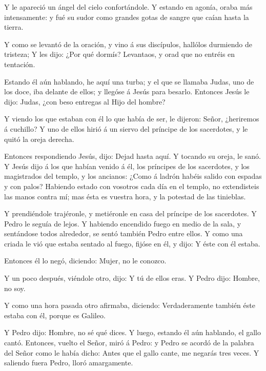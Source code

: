  Y le apareció un ángel del cielo confortándole.
 Y estando en agonía, oraba más intensamente: y fué su
sudor como grandes gotas de sangre que caían hasta la tierra.

 Y como se levantó de la oración, y vino á sus discípulos,
hallólos durmiendo de tristeza;  Y les dijo: ¿Por qué
dormís? Levantaos, y orad que no entréis en tentación.

 Estando él aún hablando, he aquí una turba; y el que se
llamaba Judas, uno de los doce, iba delante de ellos; y llegóse á Jesús
para besarlo.  Entonces Jesús le dijo: Judas, ¿con beso
entregas al Hijo del hombre?

 Y viendo los que estaban con él lo que había de ser, le
dijeron: Señor, ¿heriremos á cuchillo?  Y uno de ellos
hirió á un siervo del príncipe de los sacerdotes, y le quitó la oreja
derecha.

 Entonces respondiendo Jesús, dijo: Dejad hasta aquí. Y
tocando su oreja, le sanó.  Y Jesús dijo á los que habían
venido á él, los príncipes de los sacerdotes, y los magistrados del
templo, y los ancianos: ¿Como á ladrón habéis salido con espadas y con
palos?  Habiendo estado con vosotros cada día en el templo,
no extendisteis las manos contra mí; mas ésta es vuestra hora, y la
potestad de las tinieblas.

 Y prendiéndole trajéronle, y metiéronle en casa del
príncipe de los sacerdotes. Y Pedro le seguía de lejos.  Y
habiendo encendido fuego en medio de la sala, y sentándose todos
alrededor, se sentó también Pedro entre ellos.  Y como una
criada le vió que estaba sentado al fuego, fijóse en él, y dijo: Y éste
con él estaba.

 Entonces él lo negó, diciendo: Mujer, no le conozco.

 Y un poco después, viéndole otro, dijo: Y tú de ellos
eras. Y Pedro dijo: Hombre, no soy.

 Y como una hora pasada otro afirmaba, diciendo:
Verdaderamente también éste estaba con él, porque es Galileo.

 Y Pedro dijo: Hombre, no sé qué dices. Y luego, estando él
aún hablando, el gallo cantó.  Entonces, vuelto el Señor,
miró á Pedro: y Pedro se acordó de la palabra del Señor como le había
dicho: Antes que el gallo cante, me negarás tres veces.  Y
saliendo fuera Pedro, lloró amargamente.

